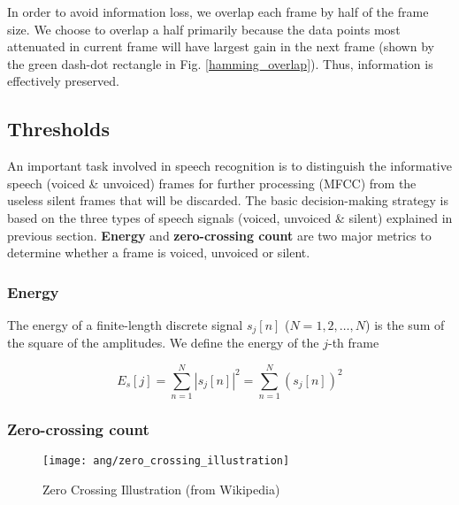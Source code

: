 In order to avoid information loss, we overlap each frame by half of the frame size. We choose to overlap a half primarily because the data points most attenuated in current frame will have largest gain in the next frame (shown by the \textcolor{green_html}{green} dash-dot rectangle in Fig. \ref{hamming_overlap}). Thus, information is effectively preserved.


\subsection{Thresholds}

An important task involved in speech recognition is to distinguish the informative speech (voiced \& unvoiced) frames for further processing (MFCC) from the useless silent frames that will be discarded. The basic decision-making strategy is based on the three types of speech signals (voiced, unvoiced \& silent) explained in previous section. \textbf{Energy} and \textbf{zero-crossing count} are two major metrics to determine whether a frame is voiced, unvoiced or silent.


\subsubsection{Energy}

The energy of a finite-length discrete signal $s_j[n]$ ($N = 1, 2, \dots, N$) is the sum of the square of the amplitudes. We define the energy of the $j$-th frame

\begin{equation}
\label{eq:frame-energy}
E_s[j] = \sum_{n=1}^{N} |s_j[n]|^2 = \sum_{n=1}^{N} (s_j[n])^2
\end{equation}


\subsubsection{Zero-crossing count}

\begin{figure}[H]
\centering
\texttt{[image: ang/zero\_crossing\_illustration]}
\caption{Zero Crossing Illustration (from Wikipedia)}
\label{zero_crossing_illustration}
\end{figure}

